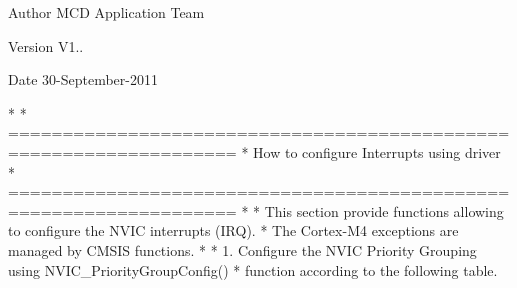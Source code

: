 \begin{DoxyAuthor}{Author}
M\+CD Application Team 
\end{DoxyAuthor}
\begin{DoxyVersion}{Version}
V1.. 
\end{DoxyVersion}
\begin{DoxyDate}{Date}
30-\/\+September-\/2011 \begin{DoxyVerb}*                               
*          ===================================================================      
*                        How to configure Interrupts using driver 
*          ===================================================================      
* 
*            This section provide functions allowing to configure the NVIC interrupts (IRQ).
*            The Cortex-M4 exceptions are managed by CMSIS functions.
*
*            1. Configure the NVIC Priority Grouping using NVIC_PriorityGroupConfig()
*                function according to the following table.


\end{DoxyVerb}
\end{DoxyDate}
